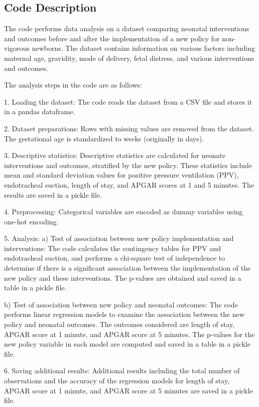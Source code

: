 \documentclass[11pt]{article}
\begin{document}
\subsection{Code Description}

The code performs data analysis on a dataset comparing neonatal interventions and outcomes before and after the implementation of a new policy for non-vigorous newborns. The dataset contains information on various factors including maternal age, gravidity, mode of delivery, fetal distress, and various interventions and outcomes.

The analysis steps in the code are as follows:

1. Loading the dataset: The code reads the dataset from a CSV file and stores it in a pandas dataframe.

2. Dataset preparations: Rows with missing values are removed from the dataset. The gestational age is standardized to weeks (originally in days).

3. Descriptive statistics: Descriptive statistics are calculated for neonate interventions and outcomes, stratified by the new policy. These statistics include mean and standard deviation values for positive pressure ventilation (PPV), endotracheal suction, length of stay, and APGAR scores at 1 and 5 minutes. The results are saved in a pickle file.

4. Preprocessing: Categorical variables are encoded as dummy variables using one-hot encoding.

5. Analysis:
   a) Test of association between new policy implementation and interventions: The code calculates the contingency tables for PPV and endotracheal suction, and performs a chi-square test of independence to determine if there is a significant association between the implementation of the new policy and these interventions. The p-values are obtained and saved in a table in a pickle file.

   b) Test of association between new policy and neonatal outcomes: The code performs linear regression models to examine the association between the new policy and neonatal outcomes. The outcomes considered are length of stay, APGAR score at 1 minute, and APGAR score at 5 minutes. The p-values for the new policy variable in each model are computed and saved in a table in a pickle file.

6. Saving additional results: Additional results including the total number of observations and the accuracy of the regression models for length of stay, APGAR score at 1 minute, and APGAR score at 5 minutes are saved in a pickle file.
\end{document}
